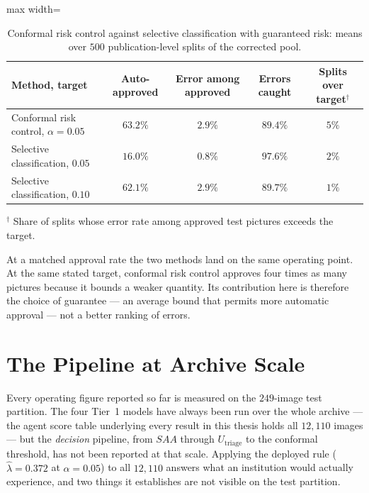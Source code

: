 \documentclass[12pt,a4paper]{report}
\begin{document}
\begin{table}[!htbp]
\centering
\small
\caption[Conformal risk control against selective classification]{Conformal risk control against selective classification with guaranteed risk: means over $500$ publication-level splits of the corrected pool.}
\label{tab:crc_vs_sgr}
\begin{adjustbox}{max width=\linewidth}
\begin{tabular}{lcccc}
\toprule
Method, target & Auto-approved & Error among approved & Errors caught & Splits over target$^{\dagger}$ \\
\midrule
Conformal risk control, $\alpha=0.05$ & $63.2\%$ & $2.9\%$ & $89.4\%$ & $5\%$ \\
Selective classification, $0.05$ & $16.0\%$ & $0.8\%$ & $97.6\%$ & $2\%$ \\
Selective classification, $0.10$ & $62.1\%$ & $2.9\%$ & $89.7\%$ & $1\%$ \\
\bottomrule
\end{tabular}
\end{adjustbox}

\smallskip
\footnotesize $^{\dagger}$ Share of splits whose error rate among approved test pictures exceeds the target.
\end{table}

At a matched approval rate the two methods land on the same operating point. At the same stated target, conformal risk control approves four times as many pictures because it bounds a weaker quantity. Its contribution here is therefore the choice of guarantee --- an average bound that permits more automatic approval --- not a better ranking of errors.



\section{The Pipeline at Archive Scale}
\label{sec:full_corpus}

Every operating figure reported so far is measured on the $249$-image test partition. The
four Tier~1 models have always been run over the whole archive --- the agent score table
underlying every result in this thesis holds all $12{,}110$ images --- but the \emph{decision}
pipeline, from $SAA$ through $U_{\text{triage}}$ to the conformal threshold, has not been
reported at that scale. Applying the deployed rule ($\hat\lambda = 0.372$ at $\alpha=0.05$)
to all $12{,}110$ answers what an institution would actually experience, and two things it
establishes are not visible on the test partition.
\end{document}
